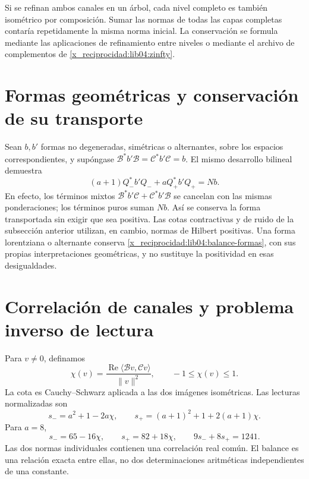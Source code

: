 Si se refinan ambos canales en un árbol, cada nivel completo es también
isométrico por composición. Sumar las normas de todas las capas
completas contaría repetidamente la misma norma inicial. La conservación
se formula mediante las aplicaciones de refinamiento entre niveles o
mediante el archivo de complementos de \eqref{x_reciprocidad:lib04:zinfty}.

\section{Formas geométricas y conservación de su transporte}
\label{x_reciprocidad:lib04:formas}

Sean \(b,b'\) formas no degeneradas, simétricas o alternantes, sobre
los espacios correspondientes, y supóngase
\(\mathcal B^*b'\mathcal B=\mathcal C^*b'\mathcal C=b\).
El mismo desarrollo bilineal demuestra
\begin{equation}
 (a+1)Q_-^*b'Q_-+aQ_+^*b'Q_+=Nb.
 \label{x_reciprocidad:lib04:balance-formas}
\end{equation}
En efecto, los términos mixtos
\(\mathcal B^*b'\mathcal C+\mathcal C^*b'\mathcal B\) se cancelan
con las mismas ponderaciones; los términos puros suman \(Nb\).
Así se conserva la forma transportada sin exigir que sea positiva.
Las cotas contractivas y de ruido de la subsección anterior utilizan,
en cambio, normas de Hilbert positivas. Una forma lorentziana o
alternante conserva \eqref{x_reciprocidad:lib04:balance-formas}, con sus propias
interpretaciones geométricas, y no sustituye la positividad en esas
desigualdades.

\section{Correlación de canales y problema inverso de lectura}
\label{x_reciprocidad:lib04:correlacion}

Para \(v\neq0\), definamos
\begin{equation}
 \chi(v)=\frac{\operatorname{Re}\langle\mathcal Bv,\mathcal Cv\rangle}
                      {\|v\|^2},\qquad -1\leq\chi(v)\leq1.
 \label{x_reciprocidad:lib04:chi}
\end{equation}
La cota es Cauchy--Schwarz aplicada a las dos imágenes isométricas.
Las lecturas normalizadas son
\begin{equation}
 s_-=a^2+1-2a\chi,\qquad
 s_+=(a+1)^2+1+2(a+1)\chi.
 \label{x_reciprocidad:lib04:s-pm}
\end{equation}
Para \(a=8\),
\begin{equation}
 s_-=65-16\chi,\qquad s_+=82+18\chi,\qquad
 9s_-+8s_+=1241.
 \label{x_reciprocidad:lib04:s-canonico}
\end{equation}
Las dos normas individuales contienen una correlación real común. El
balance es una relación exacta entre ellas, no dos determinaciones
aritméticas independientes de una constante.

